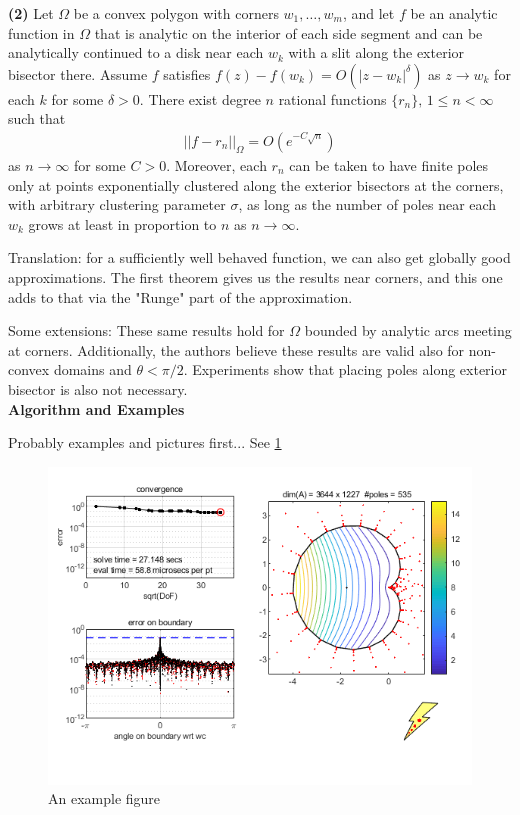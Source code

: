 \documentclass[12]{article}
\begin{document}
	\textbf{(2)} Let $\Omega$ be a convex polygon with corners $w_1 , \ldots , w_m$, and let $f$ be an analytic function in $\Omega$ that is analytic on the interior of each side segment and can be analytically continued to a disk near each $w_k$ with a slit along the exterior bisector there. Assume $f$ satisfies $f(z)-f(w_k)=O(|z-w_k|^\delta)$ as $z \to w_k$ for each $k$ for some $\delta >0$. There exist degree $n$ rational functions $\{r_n\},\, 1 \leq n < \infty$ such that
	\begin{align*}
	||f-r_n||_\Omega=O(e^{-C\sqrt{n}})
	\end{align*}
as $n\to \infty$ for some $C>0$. Moreover, each $r_n$ can be taken to have finite poles only at points exponentially clustered along the exterior bisectors at the corners, with arbitrary clustering parameter $\sigma$, as long as the number of poles near each $w_k$ grows at least in proportion to $n$ as $n\to \infty$.

	Translation: for a sufficiently well behaved function, we can also get globally good approximations. The first theorem gives us the results near corners, and this one adds to that via the "Runge" part of the approximation.
	
	Some extensions: These same results hold for $\Omega$ bounded by analytic arcs meeting at corners. Additionally, the authors believe these results are valid also for non-convex domains and $\theta < \pi /2$. Experiments show that placing poles along exterior bisector is also not necessary.\\
	
\noindent
\textbf{Algorithm and Examples}

	Probably examples and pictures first... See \ref{fig:card pic} 
	\begin{figure}[H]
	\centering
	\includegraphics[scale=0.5]{cardioid.png}
	\caption{An example figure}
	\label{fig:card pic}
	\end{figure}
	
\end{document}
